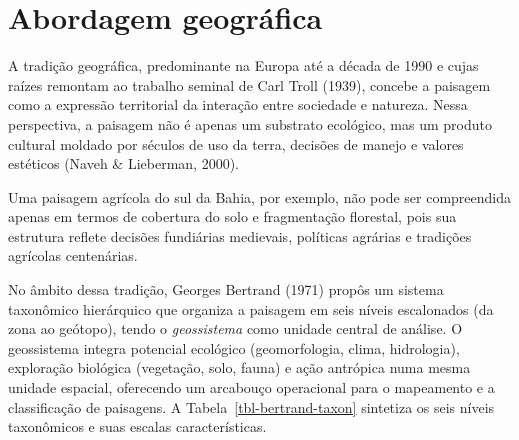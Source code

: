 \documentclass[
  portuguese,
  11pt,
  a4paper,
  open=any]{scrbook}
\begin{document}
\section{Abordagem geográfica}\label{abordagem-geogruxe1fica}

A tradição geográfica, predominante na Europa até a década de 1990 e
cujas raízes remontam ao trabalho seminal de Carl Troll (1939), concebe
a paisagem como a expressão territorial da interação entre sociedade e
natureza. Nessa perspectiva, a paisagem não é apenas um substrato
ecológico, mas um produto cultural moldado por séculos de uso da terra,
decisões de manejo e valores estéticos (Naveh \& Lieberman, 2000).

Uma paisagem agrícola do sul da Bahia, por exemplo, não pode ser
compreendida apenas em termos de cobertura do solo e fragmentação
florestal, pois sua estrutura reflete decisões fundiárias medievais,
políticas agrárias e tradições agrícolas centenárias.

No âmbito dessa tradição, Georges Bertrand (1971) propôs um sistema
taxonômico hierárquico que organiza a paisagem em seis níveis
escalonados (da zona ao geótopo), tendo o \emph{geossistema} como
unidade central de análise. O geossistema integra potencial ecológico
(geomorfologia, clima, hidrologia), exploração biológica (vegetação,
solo, fauna) e ação antrópica numa mesma unidade espacial, oferecendo um
arcabouço operacional para o mapeamento e a classificação de paisagens.
A Tabela~\ref{tbl-bertrand-taxon} sintetiza os seis níveis taxonômicos e
suas escalas características.
\end{document}
